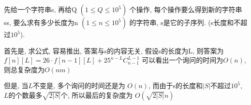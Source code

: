 先给一个字符串s, 再给Q $(1 \leq Q \leq 10^5)$ 个操作, 每个操作要么得到新的字符串ss, 要么求有多少长度为n $(1\leq n \leq 10^5)$ 的字符串, s是它的子序列. (s长度和不超过$10^5$).

首先是, 求公式, 容易推出, 答案与s的内容无关, 假设s的长度为L, 则答案为 $f[n][L] = 26 \cdot f[n-1][L] + 25^{n-L} C_{n-1}^{L-1}$
可以看出一个询问的时间为$O(n)$, 则总复杂度为$O(nm)$

但是, 当$L$不变是, 多个询问的时间还是为 $O(n)$, 而由于s的长度和$|S|$不超过$10^5$, $L$的个数最多$\sqrt{2|S|}$个, 所以最后的复杂度为 $O(\sqrt{2|S|}n)$
